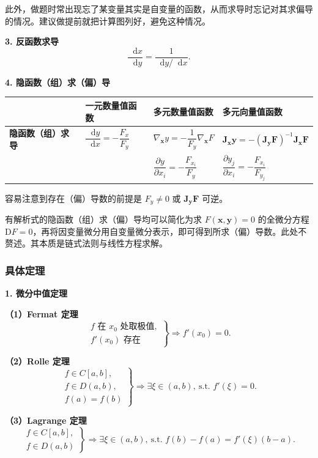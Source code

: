 \documentclass[UTF8,fontset=fandol,zihao=5]{ctexart}
\newcommand{\dd}{\mathop{}\!\mathrm{d}}
\begin{document}
此外，做题时常出现忘了某变量其实是自变量的函数，从而求导时忘记对其求偏导的情况。建议做提前就把计算图列好，避免这种情况。

\textbf{3. 反函数求导}
\[
\frac{\dd x}{\dd y}=\frac{1}{\dd y/\dd x}.
\]

\textbf{4. 隐函数（组）求（偏）导}

\begin{center}
\begin{tabularx}{\textwidth}{>{\bfseries}p{2.5cm}XXX}
\toprule
 & 一元数量值函数 & 多元数量值函数 & 多元向量值函数 \\
\midrule
隐函数（组）求导 &
$\dfrac{\dd y}{\dd x}=-\dfrac{F_x}{F_y}$ &
$\nabla_{\bm x}y=-\dfrac{1}{F_y}\nabla_{\bm x}F$ &
$\bm J_{\bm x}\bm y=-(\bm J_{\bm y}\bm F)^{-1}\bm J_{\bm x}\bm F$ \\
 & &
$\dfrac{\partial y}{\partial x_i}=-\dfrac{F_{x_i}}{F_y}$ &
$\dfrac{\partial y_j}{\partial x_i}=-\dfrac{F_{x_i}}{F_{y_j}}$ \\
\bottomrule
\end{tabularx}
\end{center}

容易注意到存在（偏）导数的前提是 $F_y\neq0$ 或 $\bm J_{\bm y}\bm F$ 可逆。

有解析式的隐函数（组）求（偏）导均可以简化为求 $F(\bm x,\bm y)=0$ 的全微分方程 $\mathrm DF=0$，再将因变量微分用自变量微分表示，即可得到所求（偏）导数。此处不赘述。其本质是链式法则与线性方程求解。

\subsubsection{具体定理}

\textbf{1. 微分中值定理}

\textbf{（1）Fermat 定理}
\[
\left.
\begin{array}{l}
f\text{ 在 }x_0\text{ 处取极值},\\
f'(x_0)\text{ 存在}
\end{array}
\right\}
\Longrightarrow f'(x_0)=0.
\]

\textbf{（2）Rolle 定理}
\[
\left.
\begin{array}{l}
f\in C[a,b],\\
f\in D(a,b),\\
f(a)=f(b)
\end{array}
\right\}
\Longrightarrow
\exists\xi\in(a,b),\ \text{s.t. }f'(\xi)=0.
\]

\textbf{（3）Lagrange 定理}
\[
\left.
\begin{array}{l}
f\in C[a,b],\\
f\in D(a,b)
\end{array}
\right\}
\Longrightarrow
\exists\xi\in(a,b),\ \text{s.t. }
f(b)-f(a)=f'(\xi)(b-a).
\]
\end{document}
